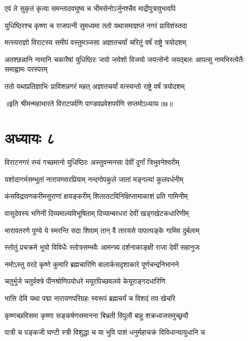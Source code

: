 \twolineshloka
{एवं ते सुकृतं कृत्वा समन्तादवघुष्य च}
{भीमसेनोऽर्जुनश्चैव माद्रीपुत्रावुभावपि}


\twolineshloka
{युधिष्ठिरश्च कृष्णा च राजपत्नी सुमध्यमा}
{ततो यथासमाज्ञप्तं नगरं प्राविशंस्तदा}


\twolineshloka
{मत्स्यराज्ञो विराटस्य समीपं वस्तुमञ्जसा}
{अज्ञातचर्यां चरितुं वर्षं राष्ट्रे त्रयोदशम्}


\threelineshloka
{अतश्छन्नानि नामानि चकारैषां युधिष्ठिरः}
{जयो जयेशो विजयो जयत्सेनो जयद्बलः}
{आपत्सु नामभिस्त्वेतैः समाह्वामः परस्परम्}


\twolineshloka
{ततो यथाप्रतिज्ञाभिः प्राविशन्नगरं महत्}
{अज्ञातचर्यां वत्स्यन्तो राष्ट्रे वर्षं त्रयोदशम्}

॥इति श्रीमन्महाभारते विराटपर्वणि पाण्डवप्रवेशपर्वणि सप्तमोऽध्यायः॥७॥

\chapter{अध्यायः ८}

\twolineshloka
{विराटनगरं रम्यं गच्छमानो युधिष्ठिरः}
{अस्तुवन्मनसा देवीं दुर्गां त्रिभुवनेश्वरीम्}


\twolineshloka
{यशोदागर्भसम्भूतां नारायणवरप्रियाम्}
{नन्दगोपकुले जातां मङ्गल्यां कुलवर्धनीम्}


\twolineshloka
{कंसविद्रावणकरीमसुराणां क्षयङ्करीम्}
{शिलातटविनिक्षिप्तामाकाशं प्रति गामिनीम्}


\twolineshloka
{वासुदेवस्य भगिनीं दिव्यमाल्यविभूषिताम्}
{दिव्याम्बरधरां देवीं खड्गखेटकधारिणीम्}


\twolineshloka
{भारावतरणे पुण्ये ये स्मरन्ति सदा शिवाम्}
{तान् वै तारयसे पापात्पङ्के गामिव दुर्बलाम्}


\twolineshloka
{स्तोतुं प्रचक्रमे भूयो विविधैः स्तोत्रसम्भवैः}
{आमन्त्र्य दर्शनाकाङ्क्षी राजा देवीं सहानुजः}


\twolineshloka
{नमोऽस्तु वरदे कृष्णे कुमारि ब्रह्मचारिणि}
{बालार्कसदृशाकारे पूर्णचन्द्रनिभानने}


\twolineshloka
{चतुर्भुजे चतुर्वक्त्रे पीनश्रोणिपयोधरे}
{मयूरपिच्छवलये केयूराङ्गदधारिणि}


\twolineshloka
{भासि देवि यथा पद्मा नारायणपरिग्रहः}
{स्वरूपं ब्रह्मचर्यं च विशदं तव खेचरि}


\twolineshloka
{कृष्णच्छविसमा कृष्णा सङ्कर्षणसमानना}
{बिभ्रती विपुलौ बाहू शक्रध्वजसमुच्छ्रयौ}


\twolineshloka
{पात्री च पङ्कजी घण्टी स्त्री विशुद्धा च या भुवि}
{पाशं धनुर्महाचक्रं विविधान्यायुधानि च}


